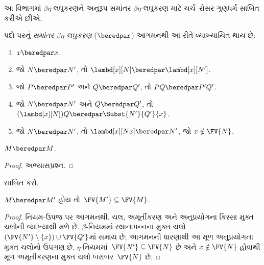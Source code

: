 \documentclass[../../../include/open-logic-section]{subfiles}
\begin{document}


આ વિભાગમાં $\beta\eta$-લઘુકરણને અનુરૂપ સમાંતર
$\beta\eta$-લઘુકરણ માટે ચર્ચ--રોસર ગુણધર્મ
સાબિત કરીએ છીએ.

\begin{defn} 
  પદો પરનું \emph{સમાંતર $\beta\eta$-લઘુકરણ}
  ($\beredpar$) આગમનથી આ રીતે વ્યાખ્યાયિત થાય છે:
  \begin{enumerate}
    \item {} $x \beredpar x$.
    \item {} જો $N \beredpar N'$,
      તો $\lambd[x][N] \beredpar \lambd[x][N']$.
    \item {} જો $P \beredpar P'$ અને
      $Q \beredpar Q'$, તો $PQ \beredpar P'Q'$.
    \item {} જો $N \beredpar N'$ અને
      $Q \beredpar Q'$, તો
      $(\lambd[x][N])Q \beredpar \Subst{N'}{Q'}{x}$.
    \item {} જો $N \beredpar N'$,
      તો $\lambd[x][Nx] \beredpar N'$, જો
      $x \notin \FV{N}$.
  \end{enumerate}
\end{defn}

\begin{thm}
  $M \beredpar M$.
\end{thm}

\begin{proof}
  અભ્યાસપ્રશ્ન.
\end{proof}

\begin{prob}
   સાબિત કરો.
\end{prob}

\begin{lem}
  $M\beredpar M'$ હોય તો~$\FV{M'}\subseteq\FV{M}$.
\end{lem}
\begin{proof}
  નિયમ-ઉપજ પર આગમનથી. ચલ, અમૂર્તીકરણ અને અનુપ્રયોગના
  કિસ્સા મુક્ત ચલોની વ્યાખ્યાથી મળે છે. $\beta$-નિયમમાં
  સ્થાનાપન્નના મુક્ત ચલો
  $(\FV{N'}\setminus\{x\})\cup\FV{Q'}$માં સમાય છે;
  આગમનની ધારણાથી આ મૂળ અનુપ્રયોગના મુક્ત ચલોનો ઉપગણ છે.
  $\eta$-નિયમમાં~$\FV{N'}\subseteq\FV{N}$ છે અને
  $x\notin\FV{N}$ હોવાથી મૂળ અમૂર્તીકરણના મુક્ત ચલો
  બરાબર~$\FV{N}$ છે.
\end{proof}
\end{document}
